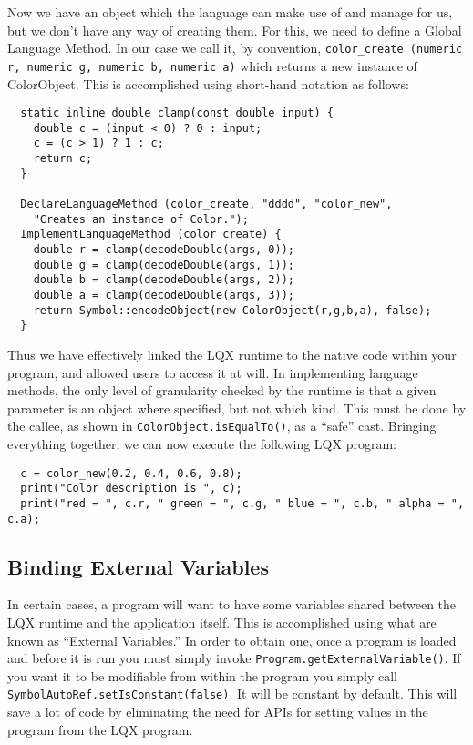\documentclass[]{article}
\newcommand{\ModLang}{LQX }
\begin{document}
  Now we have an object which the language can make use of and manage for us, but
  we don't have any way of creating them. For this, we need to define a Global Language
  Method. In our case we call it, by convention, {\tt color\_create (numeric r,
  numeric g, numeric b, numeric a)} which returns a new instance of ColorObject. This
  is accomplished using short-hand notation as follows:
  
  \lstset{language=C++}
  \begin{lstlisting}
  static inline double clamp(const double input) {
    double c = (input < 0) ? 0 : input;
    c = (c > 1) ? 1 : c;
    return c;
  }
  
  DeclareLanguageMethod (color_create, "dddd", "color_new", 
    "Creates an instance of Color.");
  ImplementLanguageMethod (color_create) {
    double r = clamp(decodeDouble(args, 0));
    double g = clamp(decodeDouble(args, 1));
    double b = clamp(decodeDouble(args, 2));
    double a = clamp(decodeDouble(args, 3));
    return Symbol::encodeObject(new ColorObject(r,g,b,a), false);
  }
  \end{lstlisting}
  
  Thus we have effectively linked the \ModLang runtime to the native code within
  your program, and allowed users to access it at will. In implementing language methods,
  the only level of granularity checked by the runtime is that a given parameter is an
  object where specified, but not which kind. This must be done by the callee, as shown
  in {\tt ColorObject.isEqualTo()}, as a ``safe'' cast. Bringing everything together,
  we can now execute the following \ModLang program:
  
  \lstset{language=C++}
  \begin{lstlisting}
  c = color_new(0.2, 0.4, 0.6, 0.8);
  print("Color description is ", c);
  print("red = ", c.r, " green = ", c.g, " blue = ", c.b, " alpha = ", c.a);
  \end{lstlisting}
  
  \subsection{Binding External Variables}
  
  In certain cases, a program will want to have some variables shared between the
  \ModLang runtime and the application itself. This is accomplished using what are known
  as ``External Variables.'' In order to obtain one, once a program is loaded and 
  before it is run you must simply invoke {\tt Program.getExternalVariable()}. If 
  you want it to be modifiable from within the program you simply call
  {\tt SymbolAutoRef.setIsConstant(false)}. It will be constant by default.
  This will save a lot of code by eliminating the need for APIs for setting
  values in the program from the \ModLang program.
  
\end{document}
